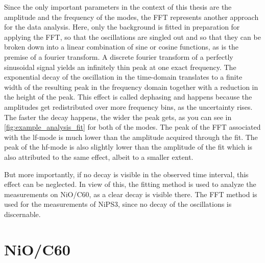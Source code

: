 Since the only important parameters in the context of this thesis are the amplitude and the frequency of the modes, the FFT represents another approach for the data analysis.
Here, only the background is fitted in preparation for applying the FFT, so that the oscillations are singled out and so that they can be broken down into a linear combination of sine or cosine functions, as is the premise of a fourier transform.
A discrete fourier transform of a perfectly sinusoidal signal yields an infinitely thin peak at one exact frequency.
The exponential decay of the oscillation in the time-domain translates to a finite width of the resulting peak in the frequency domain together with a reduction in the height of the peak.
This effect is called dephasing and happens because the amplitudes get redistributed over more frequency bins, as the uncertainty rises.
The faster the decay happens, the wider the peak gets, as you can see in \autoref{fig:example_analysis_fit} for both of the modes.
The peak of the FFT associated with the lf-mode is much lower than the amplitude acquired through the fit.
The peak of the hf-mode is also slightly lower than the amplitude of the fit which is also attributed to the same effect, albeit to a smaller extent.

But more importantly, if no decay is visible in the observed time interval, this effect can be neglected.
In view of this, the fitting method is used to analyze the measurements on NiO/C60, as a clear decay is visible there.
The FFT method is used for the measurements of NiPS3, since no decay of the oscillations is discernable.


\section{NiO/C60}
